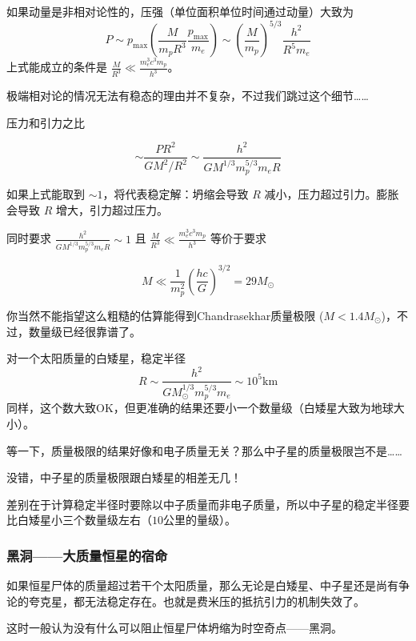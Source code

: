 \documentclass[CJK,13pt]{beamer}
\begin{document}
  \begin{frame}
    如果动量是非相对论性的，压强（单位面积单位时间通过动量）大致为
    $$P \sim p_{\max} \left(\frac{M}{m_pR^3} \frac{p_{\max}}{m_e}\right)\sim \left(\frac{M}{m_p}\right)^{5/3}\frac{h^2}{R^5m_e}$$
    上式能成立的条件是 $\frac{M}{R^3} \ll \frac{m_e^3c^3m_p}{h^3}$。

    {\scriptsize 极端相对论的情况无法有稳态的理由并不复杂，不过我们跳过这个细节……}

    \skipline

    压力和引力之比

    $$ \sim \frac{PR^2}{GM^2/R^2} \sim \frac{h^2}{GM^{1/3}m_p^{5/3}m_eR} $$

    如果上式能取到 $\sim 1$，将代表稳定解：坍缩会导致 $R$ 减小，压力超过引力。膨胀会导致 $R$ 增大，引力超过压力。
    
  \end{frame}

  
  \begin{frame}
    同时要求 $\frac{h^2}{GM^{1/3}m_p^{5/3}m_eR} \sim 1$ 且 $\frac{M}{R^3} \ll \frac{m_e^3c^3m_p}{h^3}$ 等价于要求

    $$ M \ll \frac{1}{m_p^2}\left(\frac{hc}{G}\right)^{3/2}= 29M_\odot$$

    你当然不能指望这么粗糙的估算能得到Chandrasekhar质量极限 ($M<1.4M_\odot$)，不过，数量级已经很靠谱了。

    \skiplines
    
    对一个太阳质量的白矮星，稳定半径
    $$ R\sim \frac{h^2}{GM_\odot^{1/3}m_p^{5/3}m_e} \sim 10^5\mathrm{km}$$
    同样，这个数大致OK，但更准确的结果还要小一个数量级（白矮星大致为地球大小）。
    
  \end{frame}
  

  \begin{frame}
    等一下，质量极限的结果好像和电子质量无关？那么中子星的质量极限岂不是……
  \end{frame}


  \begin{frame}
    没错，中子星的质量极限跟白矮星的相差无几！

    \skiplines
    
    差别在于计算稳定半径时要除以中子质量而非电子质量，所以中子星的稳定半径要比白矮星小三个数量级左右（$10$公里的量级）。
  \end{frame}




  \begin{frame}
    \frametitle{黑洞——大质量恒星的宿命}
    如果恒星尸体的质量超过若干个太阳质量，那么无论是白矮星、中子星还是尚有争论的夸克星，都无法稳定存在。也就是费米压的抵抗引力的机制失效了。

    \skiplines

    这时一般认为没有什么可以阻止恒星尸体坍缩为时空奇点——黑洞。
  \end{frame}
\end{document}

